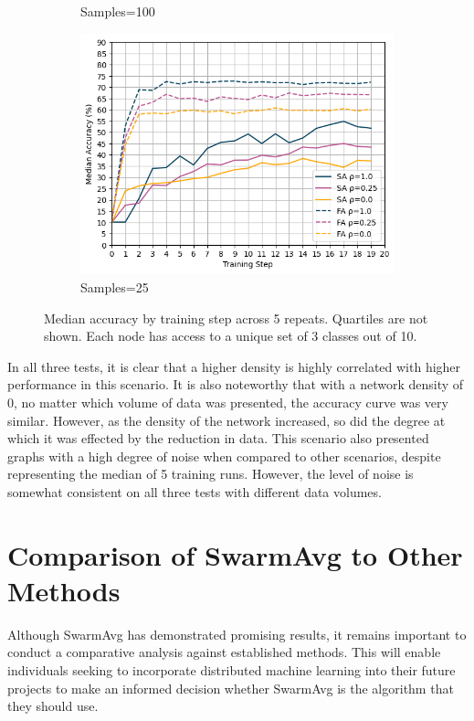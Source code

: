 \documentclass[letterpaper, 10 pt, conference]{ieeeconf}  %
\begin{document}
\begin{figure}[H]
\begin{subfigure}{0.49\textwidth}
		\caption{Samples=100}
	\end{subfigure}
	\begin{subfigure}{0.49\textwidth}
		\includegraphics[width=\textwidth]{conf_sparse_ns25_cl3}
		\caption{Samples=25}
	\end{subfigure}
	\caption{Median accuracy by training step across 5 repeats. Quartiles are not shown. Each node has access to a unique set of 3 classes out of 10.}
	\label{aeg9}
\end{figure}


In all three tests, it is clear that a higher density is highly correlated with higher performance in this scenario. It is also noteworthy that with a network density of 0, no matter which volume of data was presented, the accuracy curve was very similar. However, as the density of the network increased, so did the degree at which it was effected by the reduction in data. This scenario also presented graphs with a high degree of noise when compared to other scenarios, despite representing the median of 5 training runs. However, the level of noise is somewhat consistent on all three tests with different data volumes.

\section{Comparison of SwarmAvg to Other Methods}
Although SwarmAvg has demonstrated promising results, it remains important to conduct a comparative analysis against established methods. This will enable individuals seeking to incorporate distributed machine learning into their future projects to make an informed decision whether SwarmAvg is the algorithm that they should use.
\end{document}
